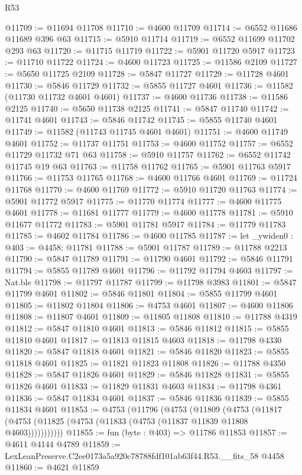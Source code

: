 \begin{lexlean}{R53}
\begin{coremodule}
@11709 := @11694 @11708
@11710 := @4600 @11709
@11714 := @6552 @11686 @11689 @396 @63
@11715 := @5910 @11714
@11719 := @6552 @11699 @11702 @293 @63
@11720 := @11715 @11719
@11722 := @5901 @11720 @5917
@11723 := @11710 @11722
@11724 := @4600 @11723
@11725 := @11586 @2109
@11727 := @5650 @11725 @2109
@11728 := @5847 @11727
@11729 := @11728 @4601
@11730 := @5846 @11729
@11732 := @5855 @11727 @4601
@11736 := @11582 (@11730 @11732 @4601 @4601)
@11737 := @4600 @11736
@11738 := @11586 @2125
@11740 := @5650 @11738 @2125
@11741 := @5847 @11740
@11742 := @11741 @4601
@11743 := @5846 @11742
@11745 := @5855 @11740 @4601
@11749 := @11582 (@11743 @11745 @4601 @4601)
@11751 := @4600 @11749 @4601
@11752 := @11737 @11751
@11753 := @4600 @11752
@11757 := @6552 @11729 @11732 @71 @63
@11758 := @5910 @11757
@11762 := @6552 @11742 @11745 @19 @63
@11763 := @11758 @11762
@11765 := @5901 @11763 @5917
@11766 := @11753 @11765
@11768 := @4600 @11766 @4601
@11769 := @11724 @11768
@11770 := @4600 @11769
@11772 := @5910 @11720 @11763
@11774 := @5901 @11772 @5917
@11775 := @11770 @11774
@11777 := @4600 @11775 @4601
@11778 := @11681 @11777
@11779 := @4600 @11778
@11781 := @5910 @11677 @11772
@11783 := @5901 @11781 @5917
@11784 := @11779 @11783
@11785 := @4602 @11784
@11786 := @4600 @11785
@11787 := let _ywiden0 : @403 := @4458; @11781
@11788 := @5901 @11787
@11789 := @11788 @2213
@11790 := @5847 @11789
@11791 := @11790 @4601
@11792 := @5846 @11791
@11794 := @5855 @11789 @4601
@11796 := @11792 @11794 @4603
@11797 := Nat.ble
@11798 := @11797 @11787
@11799 := @11798 @3983
@11801 := @5847 @11799 @4601
@11802 := @5846 @11801
@11804 := @5855 @11799 @4601
@11805 := @11802 @11804
@11806 := @4753 @4601
@11807 := @4600 @11806
@11808 := @11807 @4601
@11809 := @11805 @11808
@11810 := @11788 @4319
@11812 := @5847 @11810 @4601
@11813 := @5846 @11812
@11815 := @5855 @11810 @4601
@11817 := @11813 @11815 @4603
@11818 := @11798 @4330
@11820 := @5847 @11818 @4601
@11821 := @5846 @11820
@11823 := @5855 @11818 @4601
@11825 := @11821 @11823 @11808
@11826 := @11788 @4350
@11828 := @5847 @11826 @4601
@11829 := @5846 @11828
@11831 := @5855 @11826 @4601
@11833 := @11829 @11831 @4603
@11834 := @11798 @4361
@11836 := @5847 @11834 @4601
@11837 := @5846 @11836
@11839 := @5855 @11834 @4601
@11853 := @4753
    (@11796
      (@4753
        (@11809
          (@4753 (@11817 (@4753 (@11825 (@4753 (@11833 (@4753 (@11837 @11839 @11808 @4603)))))))))))
@11855 := fun (byte : @403) => @11786 @11853
@11857 := @4611 @4144 @4789
@11859 := LexLeanPreserve.C2ee0173a5a920c78788fdf101ab63f44.R53.__fits_58 @4458
@11860 := @4621 @11859

\end{coremodule}
\end{lexlean}

